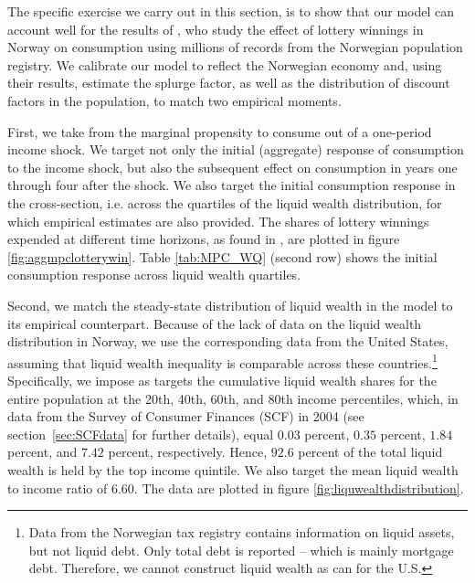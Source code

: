\documentclass[\econtexRoot/HAFiscal]{subfiles}
\begin{document}
The specific exercise we carry out in this section, is to show that our model can account well for the results of \citet{fagereng_mpc_2021}, who study the effect of lottery winnings in Norway on consumption using millions of records from the Norwegian population registry. We calibrate our model to reflect the Norwegian economy and, using their results, estimate the splurge factor, as well as the distribution of discount factors in the population, to match two empirical moments. 

First, we take from \citet{fagereng_mpc_2021} the marginal propensity to consume out of a one-period income shock. We target not only the initial (aggregate) response of consumption to the income shock, but also the subsequent effect on consumption in years one through four after the shock. We also target the initial consumption response in the cross-section, i.e. across the quartiles of the liquid wealth distribution, for which empirical estimates are also provided. The shares of lottery winnings expended at different time horizons, as found in \citet{fagereng_mpc_2021}, are plotted in figure \ref{fig:aggmpclotterywin}. Table \ref{tab:MPC_WQ} (second row) shows the initial consumption response across liquid wealth quartiles. 

Second, we match the steady-state distribution of liquid wealth in the model to its empirical counterpart. Because of the lack of data on the liquid wealth distribution in Norway, we use the corresponding data from the United States, assuming that liquid wealth inequality is comparable across these countries.\footnote{Data from the Norwegian tax registry contains information on liquid assets, but not liquid debt. Only total debt is reported -- which is mainly mortgage debt. Therefore, we cannot construct liquid wealth as \citet{kaplan2014model} can for the U.S. \notinsubfile{\label{foot:liqwealth}}} 
Specifically, we impose as targets the cumulative liquid wealth shares for the entire population at the 20th, 40th, 60th, and 80th income percentiles, which, in data from the Survey of Consumer Finances (SCF) in 2004 (see section~\ref{sec:SCFdata} for further details), equal $0.03$ percent, $0.35$ percent, $1.84$ percent, and $7.42$ percent, respectively. Hence, $92.6$ percent of the total liquid wealth is held by the top income quintile. We also target the mean liquid wealth to income ratio of 6.60. The data are plotted in figure \ref{fig:liquwealthdistribution}.
\end{document}
